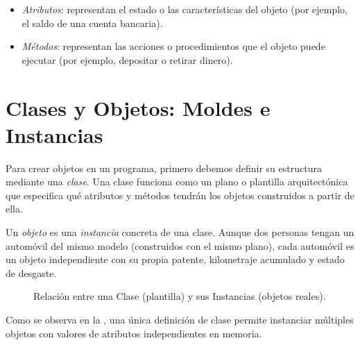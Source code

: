 \begin{itemize}[leftmargin=*]
  \item \textit{Atributos}: representan el estado o las características del objeto (por ejemplo, el saldo de una cuenta bancaria).
  \item \textit{Métodos}: representan las acciones o procedimientos que el objeto puede ejecutar (por ejemplo, depositar o retirar dinero).
\end{itemize}

\section{Clases y Objetos: Moldes e Instancias}
Para crear objetos en un programa, primero debemos definir su estructura mediante una \textit{clase}.
Una clase funciona como un plano o plantilla arquitectónica que especifica qué atributos y métodos
tendrán los objetos construidos a partir de ella.

Un \textit{objeto} es una \textit{instancia} concreta de una clase. Aunque dos personas tengan un automóvil
del mismo modelo (construidos con el mismo plano), cada automóvil es un objeto independiente con su propia
patente, kilometraje acumulado y estado de desgaste.

\begin{figure}[!ht]
  \centering
  \caption{Relación entre una Clase (plantilla) y sus Instancias (objetos reales).}
  \label{fig:clase_objeto}
\end{figure}

Como se observa en la , una única definición de clase permite instanciar múltiples objetos
con valores de atributos independientes en memoria.

